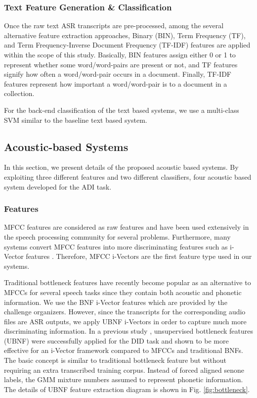 \documentclass{article}
\begin{document}
\subsubsection{Text Feature Generation \& Classification}
\label{sssec:textfeatgen}

Once the raw text ASR transcripts are pre-processed, among the several alternative feature extraction approaches, Binary (BIN), Term Frequency (TF), and Term Frequency-Inverse Document Frequency (TF-IDF) features are applied within the scope of this study. Basically, BIN features assign either 0 or 1 to represent whether some word/word-pairs are present or not, and TF features signify how often a word/word-pair occurs in a document. Finally, TF-IDF features represent how important a word/word-pair is to a document in a collection.

For the back-end classification of the text based systems, we use a multi-class SVM similar to the baseline text based system. 

\subsection{Acoustic-based Systems}
\label{ssec:acusys}
In this section, we present details of the proposed acoustic based systems. By exploiting three different features and two different classifiers, four acoustic based system developed for the ADI task.

\subsubsection{Features}
\label{sssec:feats}

MFCC features are considered as raw features and have been used extensively in the speech processing community for several problems. Furthermore, many systems convert MFCC features into more discriminating features such as i-Vector features \cite{dehak2011front}. Therefore, MFCC i-Vectors are the first feature type used in our systems.

Traditional bottleneck features have recently become popular as an alternative to MFCCs for several speech tasks since they contain both acoustic and phonetic information. We use the BNF i-Vector features which are provided by the challenge organizers. However, since the transcripts for the corresponding audio files are ASR outputs, we apply UBNF i-Vectors in order to capture much more discriminating information. In a previous study \cite{zhang2017ubnf}, unsupervised bottleneck features (UBNF) were successfully applied for the DID task and shown to be more effective for an i-Vector framework compared to MFCCs and traditional BNFs. The basic concept is similar to traditional bottleneck feature but without requiring an extra transcribed training corpus. Instead of forced aligned senone labels, the GMM mixture numbers assumed to represent phonetic information. The details of UBNF feature extraction diagram is shown in Fig. \ref{fig:bottleneck}.
\end{document}
